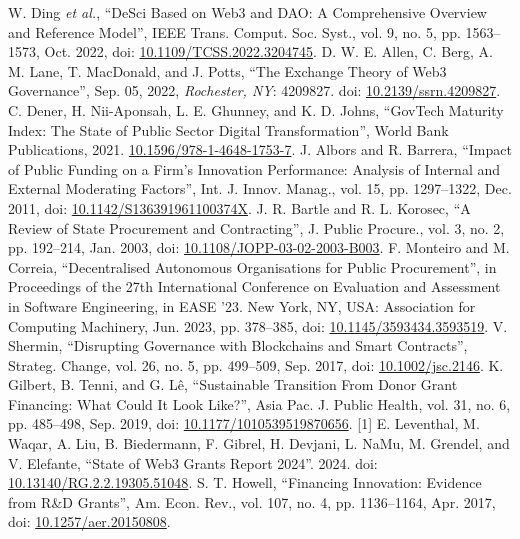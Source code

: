 \documentclass[a4,10pt]{article}
\begin{document}
\begin{thebibliography}{00}
 W. Ding \textit{et al.}, ``DeSci Based on Web3 and DAO: A Comprehensive Overview and Reference Model'', IEEE Trans. Comput. Soc. Syst., vol. 9, no. 5, pp. 1563--1573, Oct. 2022, doi: \href{https://doi.org/10.1109/TCSS.2022.3204745}{10.1109/TCSS.2022.3204745}.
 D. W. E. Allen, C. Berg, A. M. Lane, T. MacDonald, and J. Potts, ``The Exchange Theory of Web3 Governance'', Sep. 05, 2022, \textit{Rochester, NY}: 4209827. doi: \href{https://doi.org/10.2139/ssrn.4209827}{10.2139/ssrn.4209827}.
 C. Dener, H. Nii-Aponsah, L. E. Ghunney, and K. D. Johns, ``GovTech Maturity Index: The State of Public Sector Digital Transformation'', World Bank Publications, 2021. \href{https://doi.org/10.1596/978-1-4648-1753-7}{10.1596/978-1-4648-1753-7}.
 J. Albors and R. Barrera, ``Impact of Public Funding on a Firm's Innovation Performance: Analysis of Internal and External Moderating Factors'', Int. J. Innov. Manag., vol. 15, pp. 1297--1322, Dec. 2011, doi: \href{https://doi.org/10.1142/S136391961100374X}{10.1142/S136391961100374X}.
 J. R. Bartle and R. L. Korosec, ``A Review of State Procurement and Contracting'', J. Public Procure., vol. 3, no. 2, pp. 192--214, Jan. 2003, doi: \href{https://doi.org/10.1108/JOPP-03-02-2003-B003}{10.1108/JOPP-03-02-2003-B003}.
 F. Monteiro and M. Correia, ``Decentralised Autonomous Organisations for Public Procurement'', in Proceedings of the 27th International Conference on Evaluation and Assessment in Software Engineering, in EASE '23. New York, NY, USA: Association for Computing Machinery, Jun. 2023, pp. 378--385, doi: \href{https://doi.org/10.1145/3593434.3593519}{10.1145/3593434.3593519}.
 V. Shermin, ``Disrupting Governance with Blockchains and Smart Contracts'', Strateg. Change, vol. 26, no. 5, pp. 499--509, Sep. 2017, doi: \href{https://doi.org/10.1002/jsc.2146}{10.1002/jsc.2146}.
 K. Gilbert, B. Tenni, and G. Lê, ``Sustainable Transition From Donor Grant Financing: What Could It Look Like?'', Asia Pac. J. Public Health, vol. 31, no. 6, pp. 485--498, Sep. 2019, doi: \href{https://doi.org/10.1177/1010539519870656}{10.1177/1010539519870656}.
 [1] E. Leventhal, M. Waqar, A. Liu, B. Biedermann, F. Gibrel, H. Devjani, L. NaMu, M. Grendel, and V. Elefante, ``State of Web3 Grants Report 2024''. 2024. doi: \href{http://dx.doi.org/10.13140/RG.2.2.19305.51048}{10.13140/RG.2.2.19305.51048}.
 S. T. Howell, ``Financing Innovation: Evidence from R\&D Grants'', Am. Econ. Rev., vol. 107, no. 4, pp. 1136--1164, Apr. 2017, doi: \href{https://doi.org/10.1257/aer.20150808}{10.1257/aer.20150808}.

\end{thebibliography}
\end{document}
